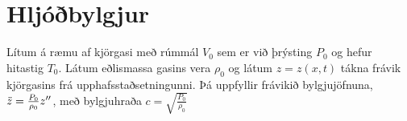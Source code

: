 \section{Hljóðbylgjur}

\begin{tcolorbox}
\begin{theorem}
Lítum á ræmu af kjörgasi með rúmmál $V_0$ sem er við þrýsting $P_0$ og hefur hitastig $T_0$. Látum eðlismassa gasins vera $\rho_0$ og látum $z = z(x,t)$ tákna frávik kjörgasins frá upphafsstaðsetningunni. Þá uppfyllir frávikið bylgjujöfnuna, $\Ddot{z} = \frac{P_0}{\rho_0} z''$, með bylgjuhraða $c = \sqrt{\frac{P_0}{\rho_0}}$
\end{theorem}
\end{tcolorbox}

